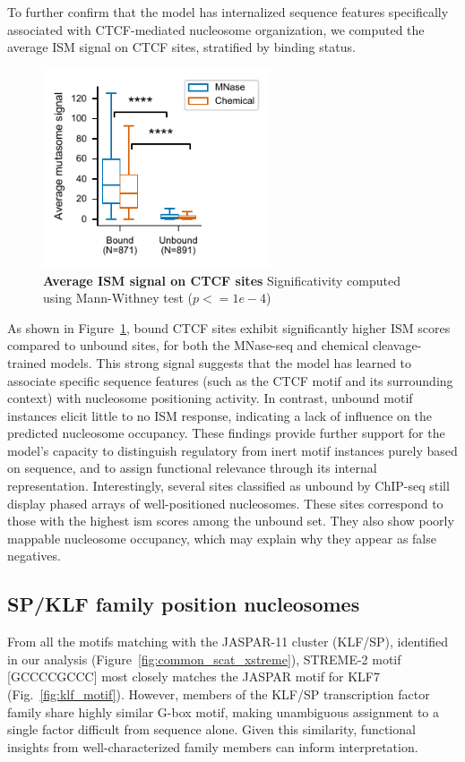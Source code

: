 \documentclass[11pt]{book}
\begin{document}
To further confirm that the model has internalized sequence features specifically associated with CTCF-mediated nucleosome organization, we computed the average ISM signal on CTCF sites, stratified by binding status.

\begin{figure}[htbp]
    \centering
    \includegraphics[width=0.6\textwidth]{Figures/Results/chr19_mnase_cmut_mutasome_on_ctcf_site_with_stats.pdf}
    \caption{\textbf{Average ISM signal on CTCF sites} Significativity computed using Mann-Withney test ($p<=1e-4$)}

    \label{fig:mut_on_ctcf_site}
\end{figure}

As shown in Figure~\ref{fig:mut_on_ctcf_site}, bound CTCF sites exhibit significantly higher ISM scores compared to unbound sites, for both the MNase-seq and chemical cleavage-trained models. This strong signal suggests that the model has learned to associate specific sequence features (such as the CTCF motif and its surrounding context) with nucleosome positioning activity. In contrast, unbound motif instances elicit little to no ISM response, indicating a lack of influence on the predicted nucleosome occupancy. These findings provide further support for the model's capacity to distinguish regulatory from inert motif instances purely based on sequence, and to assign functional relevance through its internal representation. Interestingly, several sites classified as unbound by ChIP-seq still display phased arrays of well-positioned nucleosomes. These sites correspond to those with the highest \gls{ism} scores among the unbound set. They also show poorly mappable nucleosome occupancy, which may explain why they appear as false negatives.

\FloatBarrier
\subsection{SP/KLF family position nucleosomes}
From all the motifs matching with the JASPAR-11 cluster (KLF/SP),  identified in our analysis (Figure~\ref{fig:common_scat_xstreme}), STREME-2 motif [GCCCCGCCC] most closely matches the JASPAR motif for KLF7 (Fig.~\ref{fig:klf_motif}). However, members of the KLF/SP transcription factor family share highly similar G-box motif, making unambiguous assignment to a single factor difficult from sequence alone. Given this similarity, functional insights from well-characterized family members can inform interpretation. 
\end{document}
